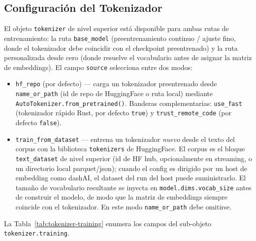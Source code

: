\subsection{Configuración del Tokenizador}
\label{subsec:tokenizer-config}

El objeto \texttt{tokenizer} de nivel superior está disponible para ambas rutas de entrenamiento: la ruta \texttt{base\_model} (preentrenamiento continuo / ajuste fino, donde el tokenizador debe coincidir con el checkpoint preentrenado) y la ruta personalizada desde cero (donde resuelve el vocabulario antes de asignar la matriz de embeddings). El campo \texttt{source} selecciona entre dos modos:

\begin{itemize}[nosep]
    \item \texttt{hf\_repo} (por defecto) --- carga un tokenizador preentrenado desde \texttt{name\_or\_path} (id de repo de HuggingFace o ruta local) mediante \texttt{AutoTokenizer.from\_pretrained()}. Banderas complementarias: \texttt{use\_fast} (tokenizador rápido Rust, por defecto \texttt{true}) y \texttt{trust\_remote\_code} (por defecto \texttt{false}).
    \item \texttt{train\_from\_dataset} --- entrena un tokenizador \emph{nuevo} desde el texto del corpus con la biblioteca \texttt{tokenizers} de HuggingFace. El corpus es el bloque \texttt{text\_dataset} de nivel superior (id de HF hub, opcionalmente en streaming, o un directorio local parquet/json); cuando el config es dirigido por un host de embedding como dashAI, el dataset del run del host puede suministrarlo. El tamaño de vocabulario resultante se inyecta en \texttt{model.dims.vocab\_size} antes de construir el modelo, de modo que la matriz de embeddings siempre coincide con el tokenizador. En este modo \texttt{name\_or\_path} debe omitirse.
\end{itemize}

La Tabla~\ref{tab:tokenizer-training} enumera los campos del sub-objeto \texttt{tokenizer.training}.

